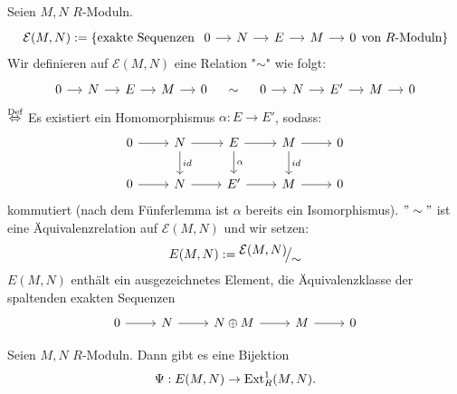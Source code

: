 \begin{bem+df}\label{10.4}
	Seien $M,N $ $R$-Moduln.
	$$\mathcal{E}(M,N) := \{\text{exakte Sequenzen }\begin{tikzcd}[column sep = small]
	0\arrow{r} & N \arrow{r} & E\arrow{r} & M \arrow{r} & 0
	\end{tikzcd} \text{von } R\text{-Moduln}\}$$ Wir definieren auf $\mathcal{E}(M,N) $ eine Relation "$\sim$" wie folgt:
	$$\begin{tikzcd}[column sep = small]
	0\arrow{r} & N \arrow{r} & E\arrow{r} & M \arrow{r} & 0
	\end{tikzcd}\quad  \sim \quad \begin{tikzcd}[column sep = small]
	0\arrow{r} & N \arrow{r} & E'\arrow{r} & M \arrow{r} & 0
	\end{tikzcd}$$ 
	$\overset{\text{Def}}{\Leftrightarrow}$ Es existiert ein Homomorphismus $\alpha:E \to E'$, sodass: 
	$$\begin{tikzcd}
	0\arrow{r} & N\arrow{d}{id} \arrow{r} & E\arrow{r} \arrow{d}{\alpha}& M\arrow{d}{id} \arrow{r} & 0\\
	0\arrow{r} & N \arrow{r} & E'\arrow{r} & M \arrow{r} & 0
	\end{tikzcd} $$ 
	kommutiert (nach dem Fünferlemma ist $\alpha$ bereits ein Isomorphismus). $"\sim"$ ist eine Äquivalenzrelation auf $\mathcal{E}(M,N)$ und wir setzen: $$E(M,N) := \QR{\mathcal{E}(M,N)}{\sim}$$
	$E(M,N)$ enthält ein ausgezeichnetes Element, die Äquivalenzklasse der spaltenden exakten Sequenzen $$\begin{tikzcd}
	0\arrow{r} & N \arrow{r} & N \oplus M \arrow{r} & M \arrow{r} & 0
	\end{tikzcd}$$
\end{bem+df}
\begin{sa}\label{10.5}
	Seien $M,N$ $R$-Moduln. Dann gibt es eine Bijektion $$\Psi:E(M,N) \to \text{Ext}_R^1(M,N).$$
\end{sa}
